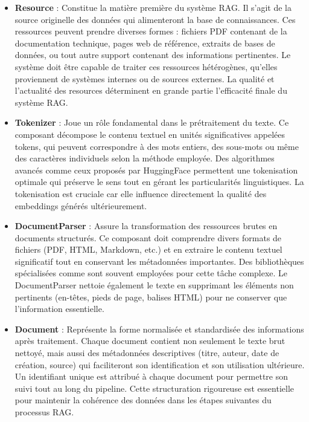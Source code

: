 \documentclass[12pt,a4paper]{report}
\begin{document}
	\begin{itemize}
		
		\item \textbf{Resource} : Constitue la matière première du système RAG. Il s'agit de la source originelle des données qui alimenteront la base de connaissances. Ces ressources peuvent prendre diverses formes : fichiers PDF contenant de la documentation technique, pages web de référence, extraits de bases de données, ou tout autre support contenant des informations pertinentes. Le système doit être capable de traiter ces ressources hétérogènes, qu'elles proviennent de systèmes internes ou de sources externes. La qualité et l'actualité des resources déterminent en grande partie l'efficacité finale du système RAG.
		
		\item \textbf{Tokenizer} : Joue un rôle fondamental dans le prétraitement du texte. Ce composant décompose le contenu textuel en unités significatives appelées tokens, qui peuvent correspondre à des mots entiers, des sous-mots ou même des caractères individuels selon la méthode employée. Des algorithmes avancés comme ceux proposés par HuggingFace permettent une tokenisation optimale qui préserve le sens tout en gérant les particularités linguistiques. La tokenisation est cruciale car elle influence directement la qualité des embeddings générés ultérieurement.
		
		\item \textbf{DocumentParser} : Assure la transformation des ressources brutes en documents structurés. Ce composant doit comprendre divers formats de fichiers (PDF, HTML, Markdown, etc.) et en extraire le contenu textuel significatif tout en conservant les métadonnées importantes. Des bibliothèques spécialisées comme sont souvent employées pour cette tâche complexe. Le DocumentParser nettoie également le texte en supprimant les éléments non pertinents (en-têtes, pieds de page, balises HTML) pour ne conserver que l'information essentielle.
		
		\item \textbf{Document} : Représente la forme normalisée et standardisée des informations après traitement. Chaque document contient non seulement le texte brut nettoyé, mais aussi des métadonnées descriptives (titre, auteur, date de création, source) qui faciliteront son identification et son utilisation ultérieure. Un identifiant unique est attribué à chaque document pour permettre son suivi tout au long du pipeline. Cette structuration rigoureuse est essentielle pour maintenir la cohérence des données dans les étapes suivantes du processus RAG.
		

\end{itemize}
\end{document}
